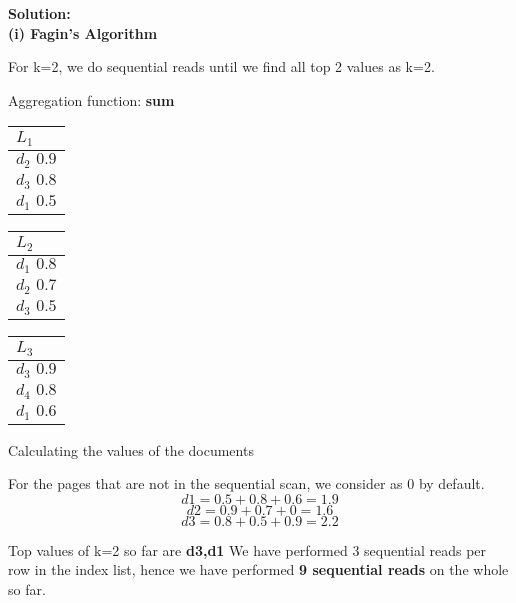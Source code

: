   \textbf{Solution:} 
\\
\textbf{(i) Fagin's Algorithm}

For k=2, we do sequential reads until we find all top 2 values as k=2.

Aggregation function: \textbf{sum}

    \begin{center}
      \begin{minipage}[t]{2cm}
        \begin{tabular}{|p{25pt}|}\hline
          $L_1$\\\hline
          $d_2 \, \, 0.9$\\\hline
          $d_3 \, \, 0.8$\\\hline
          $d_1 \, \, 0.5$\\\hline
        \end{tabular}
    \end{minipage}
    \hspace{5mm}
    \begin{minipage}[t]{2cm}
        \begin{tabular}{|p{25pt}|}\hline
          $L_2$\\\hline
          $d_1 \, \, 0.8$\\\hline
          $d_2 \, \, 0.7$\\\hline
          $d_3 \, \, 0.5$\\\hline
        \end{tabular}
    \end{minipage}
    \hspace{5mm}
    \begin{minipage}[t]{2cm}
        \begin{tabular}{|p{25pt}|}\hline
        $L_3$\\\hline
        $d_3 \, \, 0.9$\\\hline
        $d_4 \, \, 0.8$\\\hline
        $d_1 \, \, 0.6$\\\hline
        \end{tabular}
    \end{minipage}
    \end{center}

Calculating the values of the documents

For the pages that are not in the sequential scan, we consider as 0 by default.
\[d1 = 0.5 + 0.8 + 0.6 = 1.9 \] 
\[d2 = 0.9 + 0.7 + 0 = 1.6 \]
\[d3 = 0.8 + 0.5 + 0.9 = 2.2 \]

Top values of k=2 so far are \textbf{d3,d1}
We have performed 3 sequential reads per row in the index list, hence we have performed \textbf{9 sequential reads} on the whole so far.

